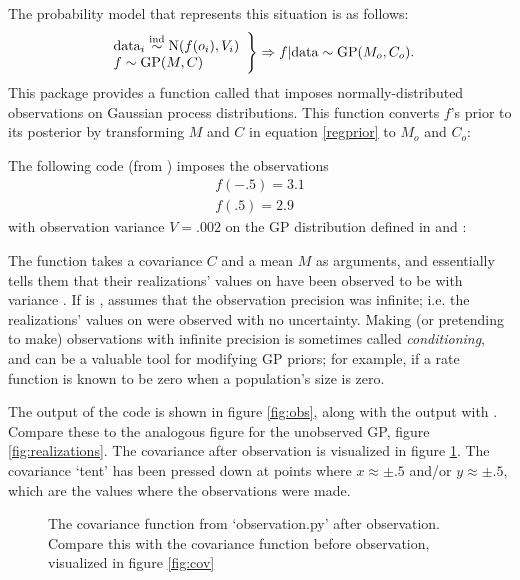 The probability model that represents this situation is as follows:
\begin{equation}
    \label{regprior}
    \left.\begin{array}{l}
        \textup{data}_i \stackrel{\tiny{\textup{ind}}}{\sim} \textup{N}(f(o_i), V_i)\\
        f \sim \textup{GP}(M,C)\\
    \end{array}\right\}\Rightarrow f|\textup{data} \sim \textup{GP}(M_o, C_o).
\end{equation}
This package provides a function called  that imposes normally-distributed observations on Gaussian process distributions. This function converts $f$'s prior to its posterior by transforming $M$ and $C$ in equation \ref{regprior} to $M_o$ and $C_o$:

The following code (from ) imposes the observations
\begin{eqnarray*}
    f(-.5) = 3.1\\
    f(.5) = 2.9
\end{eqnarray*}
with observation variance $V=.002$ on the GP distribution defined in  and :


The function  takes a covariance $C$ and a mean $M$ as arguments, and essentially tells them that their realizations' values on  have been observed to be  with variance . If  is ,  assumes that the observation precision was infinite; i.e. the realizations' values on  were observed with no uncertainty. Making (or pretending to make) observations with infinite precision is sometimes called \emph{conditioning}, and can be a valuable tool for modifying GP priors; for example, if a rate function is known to be zero when a population's size is zero.

The output of the code is shown in figure \ref{fig:obs}, along with the output with . Compare these to the analogous figure for the unobserved GP, figure \ref{fig:realizations}. The covariance after observation is visualized in figure \ref{fig:obscov}. The covariance `tent' has been pressed down at points where $x\approx \pm .5$ and/or $y\approx\pm .5$, which are the values where the observations were made.

\begin{figure}
    \centering
    \caption{The covariance function from {\sffamily `observation.py'} after observation. Compare this with the covariance function before observation, visualized in figure \ref{fig:cov} }
    \label{fig:obscov}
\end{figure}

